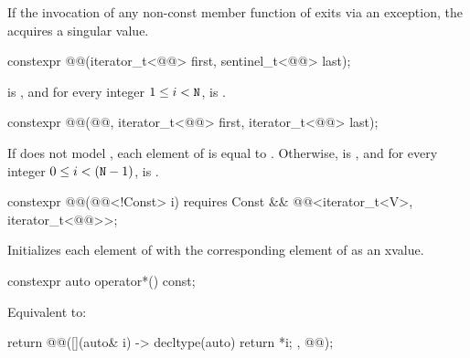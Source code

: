 \pnum
If the invocation of any non-const member function of 
exits via an exception, the  acquires a singular value.

\begin{itemdecl}
constexpr @@(iterator_t<@@> first, sentinel_t<@@> last);
\end{itemdecl}

\begin{itemdescr}
\pnum
\ensures
{} is , and
for every integer $1 \leq i < \texttt{N}$,
is .
\end{itemdescr}

\begin{itemdecl}
constexpr @@(@@, iterator_t<@@> first, iterator_t<@@> last);
\end{itemdecl}

\begin{itemdescr}
\pnum
\ensures
If  does not model ,
each element of  is equal to .
Otherwise,  is , and
for every integer $0 \leq i < (\texttt{N} - 1)$,
is .
\end{itemdescr}

\begin{itemdecl}
constexpr @@(@@<!Const> i)
  requires Const && @@<iterator_t<V>, iterator_t<@@>>;
\end{itemdecl}

\begin{itemdescr}
\pnum
\effects
Initializes each element of 
with the corresponding element of  as an xvalue.
\end{itemdescr}

\begin{itemdecl}
constexpr auto operator*() const;
\end{itemdecl}

\begin{itemdescr}
\pnum
\effects
Equivalent to:
\begin{codeblock}
return @@([](auto& i) -> decltype(auto) { return *i; }, @@);
\end{codeblock}
\end{itemdescr}

